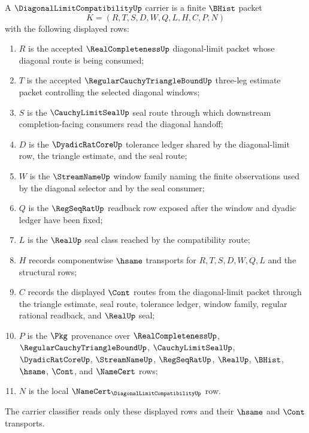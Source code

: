\begin{definition}
\label{def:diagonal-limit-compatibility-carrier}
A $\DiagonalLimitCompatibilityUp$ carrier is a finite $\BHist$ packet
$$
K=(R,T,S,D,W,Q,L,H,C,P,N)
$$
with the following displayed rows:
\begin{enumerate}
\item $R$ is the accepted $\RealCompletenessUp$ diagonal-limit packet whose
diagonal route is being consumed;
\item $T$ is the accepted $\RegularCauchyTriangleBoundUp$ three-leg estimate
packet controlling the selected diagonal windows;
\item $S$ is the $\CauchyLimitSealUp$ seal route through which downstream
completion-facing consumers read the diagonal handoff;
\item $D$ is the $\DyadicRatCoreUp$ tolerance ledger shared by the
diagonal-limit row, the triangle estimate, and the seal route;
\item $W$ is the $\StreamNameUp$ window family naming the finite observations
used by the diagonal selector and by the seal consumer;
\item $Q$ is the $\RegSeqRatUp$ readback row exposed after the window and
dyadic ledger have been fixed;
\item $L$ is the $\RealUp$ seal class reached by the compatibility route;
\item $H$ records componentwise $\hsame$ transports for
$R,T,S,D,W,Q,L$ and the structural rows;
\item $C$ records the displayed $\Cont$ routes from the diagonal-limit packet
through the triangle estimate, seal route, tolerance ledger, window family,
regular rational readback, and $\RealUp$ seal;
\item $P$ is the $\Pkg$ provenance over $\RealCompletenessUp$,
$\RegularCauchyTriangleBoundUp$, $\CauchyLimitSealUp$, $\DyadicRatCoreUp$,
$\StreamNameUp$, $\RegSeqRatUp$, $\RealUp$, $\BHist$, $\hsame$, $\Cont$,
and $\NameCert$ rows;
\item $N$ is the local $\NameCert_{\DiagonalLimitCompatibilityUp}$ row.
\end{enumerate}
The carrier classifier reads only these displayed rows and their $\hsame$ and
$\Cont$ transports.
\end{definition}

